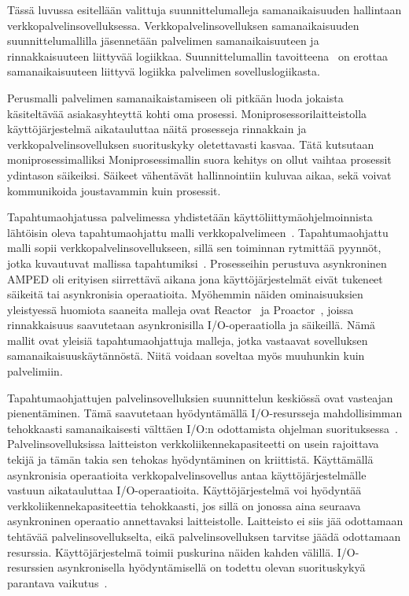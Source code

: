 \documentclass[finnish]{tktltiki2}
\theoremstyle{definition}
\theoremstyle{remark}
\begin{document}
Tässä luvussa esitellään valittuja
suunnittelumalleja samanaikaisuuden
hallintaan verkkopalvelinsovelluksessa.
Verkkopalvelinsovelluksen samanaikaisuuden suunnittelumallilla
jäsennetään palvelimen samanaikaisuuteen ja rinnakkaisuuteen
liittyvää logiikkaa. Suunnittelumallin tavoitteena~\cite{hu_applying_1998} on
erottaa samanaikaisuuteen liittyvä logiikka 
palvelimen sovelluslogiikasta.

Perusmalli palvelimen samanaikaistamiseen oli pitkään
luoda jokaista käsiteltävää asiakasyhteyttä kohti
oma prosessi. Moniprosessorilaitteistolla käyttöjärjestelmä
aikatauluttaa näitä prosesseja rinnakkain ja verkkopalvelinsovelluksen
suorituskyky oletettavasti kasvaa. Tätä kutsutaan moniprosessimalliksi
Moniprosessimallin suora kehitys on ollut vaihtaa prosessit ydintason
säikeiksi.
Säikeet vähentävät hallinnointiin kuluvaa aikaa, sekä
voivat kommunikoida joustavammin kuin prosessit.

Tapahtumaohjatussa palvelimessa yhdistetään
käyttöliittymäohjelmoinnista lähtöisin oleva tapahtumaohjattu malli
verkkopalvelimeen~\cite{pai_flash_1999}. Tapahtumaohjattu malli sopii verkkopalvelinsovellukseen,
sillä sen toiminnan rytmittää pyynnöt, jotka
kuvautuvat mallissa tapahtumiksi~\cite{schmidt_reactor:_1995}.
Prosesseihin perustuva asynkroninen AMPED\cite{pai_flash_1999}
oli erityisen siirrettävä aikana jona käyttöjärjestelmät
eivät tukeneet säikeitä tai asynkronisia operaatioita.
Myöhemmin näiden ominaisuuksien yleistyessä
huomiota saaneita malleja ovat Reactor~\cite{schmidt_reactor:_1995}
ja Proactor~\cite{hu_applying_1998}, joissa
rinnakkaisuus saavutetaan asynkronisilla I/O-operaatiolla
ja säikeillä. Nämä mallit ovat yleisiä tapahtumaohjattuja malleja, jotka
vastaavat sovelluksen samanaikaisuuskäytännöstä.
Niitä voidaan soveltaa myös muuhunkin kuin palvelimiin.


Tapahtumaohjattujen palvelinsovelluksien suunnittelun keskiössä
ovat vasteajan pienentäminen.
Tämä saavutetaan hyödyntämällä I/O-resursseja mahdollisimman tehokkaasti
samanaikaisesti välttäen I/O:n odottamista ohjelman suorituksessa~\cite{pai_flash_1999}.
Palvelinsovelluksissa
laitteiston verkkoliikennekapasiteetti on usein rajoittava tekijä ja tämän takia
sen tehokas hyödyntäminen on kriittistä.
Käyttämällä asynkronisia operaatioita verkkopalvelinsovellus
antaa käyttöjärjestelmälle vastuun aikatauluttaa I/O-operaatioita.
Käyttöjärjestelmä voi hyödyntää verkkoliikennekapasiteettia
tehokkaasti, jos sillä on jonossa aina seuraava asynkroninen operaatio
annettavaksi laitteistolle. Laitteisto ei siis jää odottamaan tehtävää
palvelinsovellukselta, eikä palvelinsovelluksen tarvitse jäädä
odottamaan resurssia. Käyttöjärjestelmä toimii
puskurina näiden kahden välillä.
I/O-resurssien asynkronisella hyödyntämisellä on todettu
olevan suorituskykyä parantava vaikutus~\cite{hu_applying_1998}.
\end{document}
